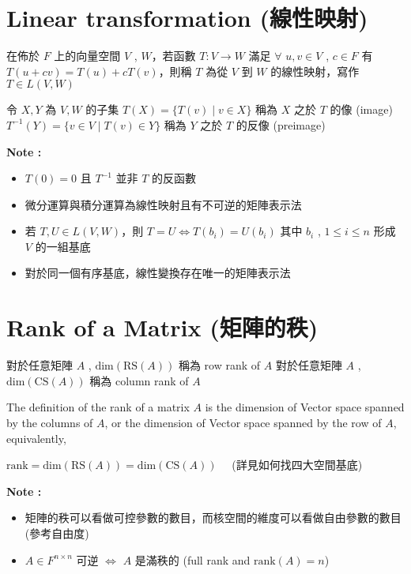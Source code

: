 \documentclass[
]{book}
\providecommand{\tightlist}{%
  \setlength{\itemsep}{0pt}\setlength{\parskip}{0pt}}
\begin{document}
\hypertarget{linear-transformation-ux7ddaux6027ux6620ux5c04}{%
\section{Linear transformation (線性映射)}\label{linear-transformation-ux7ddaux6027ux6620ux5c04}}

在佈於 \(F\) 上的向量空間 \(V\) , \(W\)，若函數 \(T:V \rightarrow W\) 滿足 \(\forall\) \(u, v \in V\) , \(c \in F\) 有
\(T(u+cv) = T(u) + cT(v)\)，則稱 \(T\) 為從 \(V\) 到 \(W\) 的線性映射，寫作 \(T \in L(V, W)\)

令 \(X,Y\) 為 \(V,W\) 的子集
\(T(X) = \{T(v)\mid v \in X\}\) 稱為 \(X\) 之於 \(T\) 的像 (image)
\(T^{-1}(Y) = \{v \in V\mid T(v) \in Y\}\) 稱為 \(Y\) 之於 \(T\) 的反像 (preimage)

\textbf{Note :}

\begin{itemize}
\tightlist
\item
  \(T(0) = 0\) 且 \(T^{-1}\) 並非 \(T\) 的反函數
\item
  微分運算與積分運算為線性映射且有不可逆的矩陣表示法
\item
  若 \(T,U \in L(V,W)\)，則 \(T = U \iff T(b_i) = U(b_i)\) 其中 \(b_i\) , \(1 \leq i \leq n\) 形成 \(V\) 的一組基底
\item
  對於同一個有序基底，線性變換存在唯一的矩陣表示法
\end{itemize}

\hypertarget{rank-of-a-matrix-ux77e9ux9663ux7684ux79e9}{%
\section{Rank of a Matrix (矩陣的秩)}\label{rank-of-a-matrix-ux77e9ux9663ux7684ux79e9}}

對於任意矩陣 \(A\) , \(\mbox{dim}(\mbox{RS}(A))\) 稱為 row rank of \(A\)
對於任意矩陣 \(A\) , \(\mbox{dim}(\mbox{CS}(A))\) 稱為 column rank of \(A\)

The definition of the rank of a matrix \(A\) is the dimension of Vector space spanned by the columns of \(A\), or the dimension of Vector space spanned by the row of \(A\), equivalently,

\(\mbox{rank} = \mbox{dim}(\mbox{RS}(A)) = \mbox{dim}(\mbox{CS}(A))\)  (詳見如何找四大空間基底)

\textbf{Note :}

\begin{itemize}
\tightlist
\item
  矩陣的秩可以看做可控參數的數目，而核空間的維度可以看做自由參數的數目 (參考自由度)
\item
  \(A \in F^{n \times n}\) 可逆 \(\iff\) \(A\) 是滿秩的 (full rank and \(\mbox{rank}(A) = n\))
\end{itemize}
\end{document}
